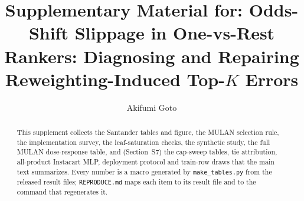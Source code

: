 \documentclass[sigconf,nonacm]{acmart}
\begin{document}
\title{Supplementary Material for: Odds-Shift Slippage in One-vs-Rest Rankers: Diagnosing and Repairing Reweighting-Induced Top-$K$ Errors}

\author{Akifumi Goto}

\begin{abstract}
This supplement collects the Santander tables and figure, the MULAN selection rule, the implementation survey, the leaf-saturation checks, the synthetic study, the full MULAN dose-response table, and (Section~S7) the cap-sweep tables, tie attribution, all-product Instacart MLP, deployment protocol and train-row draws that the main text summarizes. Every number is a macro generated by \texttt{make\_tables.py} from the released result files; \texttt{REPRODUCE.md} maps each item to its result file and to the command that regenerates it.
\end{abstract}
\maketitle
\end{document}
